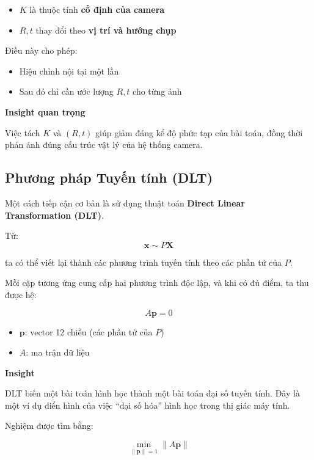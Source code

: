 \begin{itemize}
	\item $K$ là thuộc tính \textbf{cố định của camera}
	\item $R, t$ thay đổi theo \textbf{vị trí và hướng chụp}
\end{itemize}

Điều này cho phép:
\begin{itemize}
	\item Hiệu chỉnh nội tại một lần
	\item Sau đó chỉ cần ước lượng $R, t$ cho từng ảnh
\end{itemize}

\begin{mdframed}[style=infobox]
	\textbf{Insight quan trọng}
	
	Việc tách $K$ và $(R,t)$ giúp giảm đáng kể độ phức tạp của bài toán, đồng thời phản ánh đúng cấu trúc vật lý của hệ thống camera.
\end{mdframed}

\subsection{Phương pháp Tuyến tính (DLT)}
\label{subsec:dlt}

Một cách tiếp cận cơ bản là sử dụng thuật toán \textbf{Direct Linear Transformation (DLT)}.

Từ:
\[
\mathbf{x} \sim P \mathbf{X}
\]

ta có thể viết lại thành các phương trình tuyến tính theo các phần tử của $P$.

Mỗi cặp tương ứng cung cấp hai phương trình độc lập, và khi có đủ điểm, ta thu được hệ:

\[
A \mathbf{p} = 0
\]

\begin{itemize}
	\item $\mathbf{p}$: vector 12 chiều (các phần tử của $P$)
	\item $A$: ma trận dữ liệu
\end{itemize}

\begin{mdframed}[style=infobox]
	\textbf{Insight}
	
	DLT biến một bài toán hình học thành một bài toán đại số tuyến tính. Đây là một ví dụ điển hình của việc “đại số hóa” hình học trong thị giác máy tính.
\end{mdframed}

Nghiệm được tìm bằng:

\[
\min_{\|\mathbf{p}\|=1} \|A\mathbf{p}\|
\]

